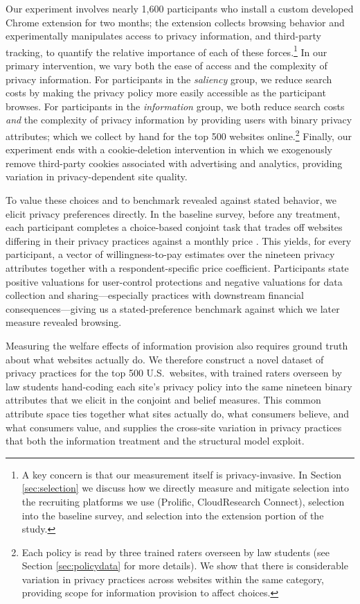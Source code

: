 \documentclass[12pt]{article}
\theoremstyle{definition}
\theoremstyle{remark}
\begin{document}
Our experiment involves nearly 1,600 participants who install a custom developed Chrome extension for two months; the extension collects browsing behavior and experimentally manipulates access to privacy information, and third-party tracking, to quantify the relative importance of each of these forces.\footnote{A key concern is that our measurement itself is privacy-invasive. In Section \ref{sec:selection} we discuss how we directly measure and mitigate selection into the recruiting platforms we use (Prolific, CloudResearch Connect), selection into the baseline survey, and selection into the extension portion of the study.} In our primary intervention, we vary both the ease of access and the complexity of privacy information. For participants in the \textit{saliency} group, we reduce search costs by making the privacy policy more easily accessible as the participant browses. For participants in the \textit{information} group, we both reduce search costs \emph{and} the complexity of privacy information by providing users with binary privacy attributes; which we collect by hand for the top 500 websites online.\footnote{Each policy is read by three trained raters overseen by law students (see Section \ref{sec:policydata} for more details). We show that there is considerable variation in privacy practices across websites within the same category, providing scope for information provision to affect choices.} Finally, our experiment ends with a cookie-deletion intervention in which we exogenously remove third-party cookies associated with advertising and analytics, providing variation in privacy-dependent site quality.

To value these choices and to benchmark revealed against stated behavior, we elicit privacy preferences directly. In the baseline survey, before any treatment, each participant completes a choice-based conjoint task that trades off websites differing in their privacy practices against a monthly price \citep{ALLENBY2019151}. This yields, for every participant, a vector of willingness-to-pay estimates over the nineteen privacy attributes together with a respondent-specific price coefficient. Participants state positive valuations for user-control protections and negative valuations for data collection and sharing---especially practices with downstream financial consequences---giving us a stated-preference benchmark against which we later measure revealed browsing.

Measuring the welfare effects of information provision also requires ground truth about what websites actually do. We therefore construct a novel dataset of privacy practices for the top 500 U.S.\ websites, with trained raters overseen by law students hand-coding each site's privacy policy into the same nineteen binary attributes that we elicit in the conjoint and belief measures. This common attribute space ties together what sites actually do, what consumers believe, and what consumers value, and supplies the cross-site variation in privacy practices that both the information treatment and the structural model exploit.
\end{document}
